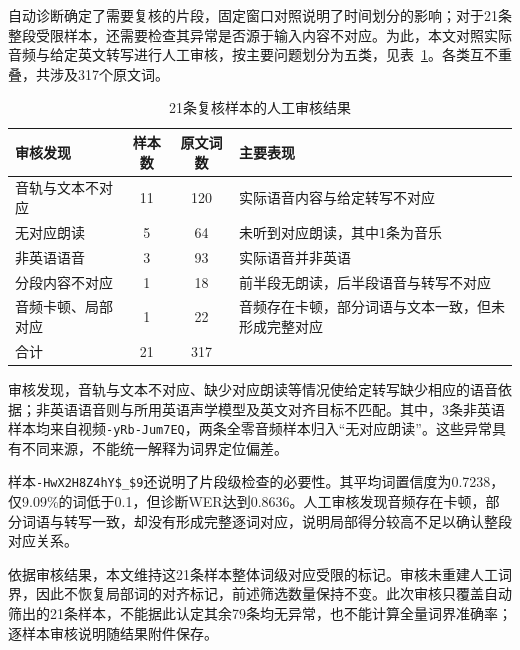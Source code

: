 自动诊断确定了需要复核的片段，固定窗口对照说明了时间划分的影响；对于21条整段受限样本，还需要检查其异常是否源于输入内容不对应。为此，本文对照实际音频与给定英文转写进行人工审核，按主要问题划分为五类，见表~\ref{tab:p1_manual_review}。各类互不重叠，共涉及317个原文词。

\begin{table}[H]
    \centering\small
    \caption{21条复核样本的人工审核结果}
    \label{tab:p1_manual_review}
    \setlength{\tabcolsep}{6pt}
    \renewcommand{\arraystretch}{1.12}
    \ifdefined\pOneCompactTableBox\else\newsavebox{\pOneCompactTableBox}\fi
    \begin{lrbox}{\pOneCompactTableBox}
    \begin{tabular}{lcc>{\raggedright\arraybackslash}p{18em}}
        \toprule
        审核发现 & 样本数 & 原文词数 & 主要表现\\
        \midrule
        音轨与文本不对应 & 11 & 120 & 实际语音内容与给定转写不对应\\
        无对应朗读 & 5 & 64 & 未听到对应朗读，其中1条为音乐\\
        非英语语音 & 3 & 93 & 实际语音并非英语\\
        分段内容不对应 & 1 & 18 & 前半段无朗读，后半段语音与转写不对应\\
        音频卡顿、局部对应 & 1 & 22 & 音频存在卡顿，部分词语与文本一致，但未形成完整对应\\
        \midrule
        合计 & 21 & 317 & \\
        \bottomrule
    \end{tabular}
    \end{lrbox}
    \usebox{\pOneCompactTableBox}
\end{table}

审核发现，音轨与文本不对应、缺少对应朗读等情况使给定转写缺少相应的语音依据；非英语语音则与所用英语声学模型及英文对齐目标不匹配。其中，3条非英语样本均来自视频\nolinkurl{-yRb-Jum7EQ}，两条全零音频样本归入“无对应朗读”。这些异常具有不同来源，不能统一解释为词界定位偏差。

样本\nolinkurl{-HwX2H8Z4hY$_$9}还说明了片段级检查的必要性。其平均词置信度为0.7238，仅9.09\%的词低于0.1，但诊断WER达到0.8636。人工审核发现音频存在卡顿，部分词语与转写一致，却没有形成完整逐词对应，说明局部得分较高不足以确认整段对应关系。

依据审核结果，本文维持这21条样本整体词级对应受限的标记。审核未重建人工词界，因此不恢复局部词的对齐标记，前述筛选数量保持不变。此次审核只覆盖自动筛出的21条样本，不能据此认定其余79条均无异常，也不能计算全量词界准确率；逐样本审核说明随结果附件保存。

